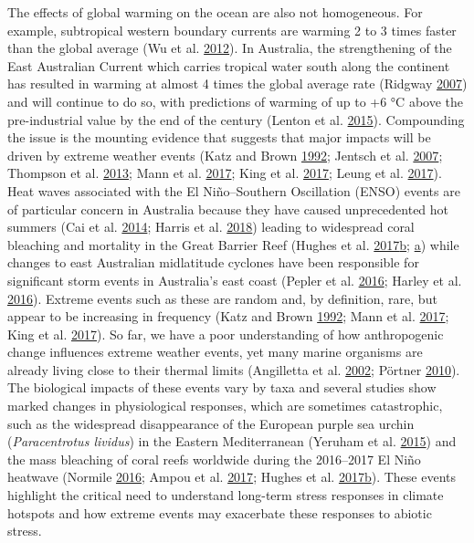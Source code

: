 \documentclass[a4paper,10pt, oneside]{memoir}
\begin{document}
The effects of global warming on the ocean are also not homogeneous. For example, subtropical western boundary currents are warming 2 to 3 times faster than the global average (Wu et al. \protect\hyperlink{ref-Wu2012}{2012}).
In Australia, the strengthening of the East Australian Current which carries tropical water south along the continent has resulted in warming at almost 4 times the global average rate (Ridgway \protect\hyperlink{ref-Ridgway2007}{2007}) and will continue to do so, with predictions of warming of up to +6 °C above the pre-industrial value by the end of the century (Lenton et al. \protect\hyperlink{ref-Lenton2015}{2015}).
Compounding the issue is the mounting evidence that suggests that major impacts will be driven by extreme weather events (Katz and Brown \protect\hyperlink{ref-Katz1992}{1992}; Jentsch et al. \protect\hyperlink{ref-Jentsch2007}{2007}; Thompson et al. \protect\hyperlink{ref-Thompson2013}{2013}; Mann et al. \protect\hyperlink{ref-Mann2017}{2017}; King et al. \protect\hyperlink{ref-King2017}{2017}; Leung et al. \protect\hyperlink{ref-Leung2017}{2017}).
Heat waves associated with the El Niño--Southern Oscillation (ENSO) events are of particular concern in Australia because they have caused unprecedented hot summers (Cai et al. \protect\hyperlink{ref-Cai2014}{2014}; Harris et al. \protect\hyperlink{ref-Harris2018}{2018}) leading to widespread coral bleaching and mortality in the Great Barrier Reef (Hughes et al. \protect\hyperlink{ref-Hughes2017a}{2017}\protect\hyperlink{ref-Hughes2017a}{b}; \protect\hyperlink{ref-Hughes2017}{a}) while changes to east Australian midlatitude cyclones have been responsible for significant storm events in Australia's east coast (Pepler et al. \protect\hyperlink{ref-Pepler2016}{2016}; Harley et al. \protect\hyperlink{ref-Harley2016}{2016}).
Extreme events such as these are random and, by definition, rare, but appear to be increasing in frequency (Katz and Brown \protect\hyperlink{ref-Katz1992}{1992}; Mann et al. \protect\hyperlink{ref-Mann2017}{2017}; King et al. \protect\hyperlink{ref-King2017}{2017}).
So far, we have a poor understanding of how anthropogenic change influences extreme weather events, yet many marine organisms are already living close to their thermal limits (Angilletta et al. \protect\hyperlink{ref-Angilletta2002}{2002}; Pörtner \protect\hyperlink{ref-Portner2010}{2010}).
The biological impacts of these events vary by taxa and several studies show marked changes in physiological responses, which are sometimes catastrophic, such as the widespread disappearance of the European purple sea urchin (\emph{Paracentrotus lividus}) in the Eastern Mediterranean (Yeruham et al. \protect\hyperlink{ref-Yeruham2015}{2015}) and the mass bleaching of coral reefs worldwide during the 2016--2017 El Niño heatwave (Normile \protect\hyperlink{ref-Normile2016}{2016}; Ampou et al. \protect\hyperlink{ref-Ampou2017}{2017}; Hughes et al. \protect\hyperlink{ref-Hughes2017a}{2017}\protect\hyperlink{ref-Hughes2017a}{b}).
These events highlight the critical need to understand long-term stress responses in climate hotspots and how extreme events may exacerbate these responses to abiotic stress.
\end{document}
